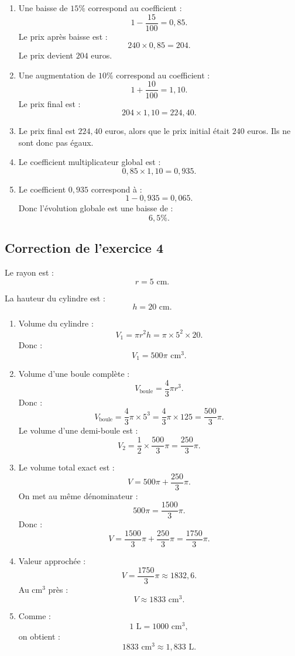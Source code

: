 \documentclass[11pt,a4paper]{article}
\begin{document}
\begin{enumerate}
    \item Une baisse de $15\%$ correspond au coefficient :
    \[
    1-\frac{15}{100}=0{,}85.
    \]
    Le prix après baisse est :
    \[
    240\times 0{,}85=204.
    \]
    Le prix devient $204$ euros.
    
    \item Une augmentation de $10\%$ correspond au coefficient :
    \[
    1+\frac{10}{100}=1{,}10.
    \]
    Le prix final est :
    \[
    204\times 1{,}10=224{,}40.
    \]
    
    \item Le prix final est $224{,}40$ euros, alors que le prix initial était $240$ euros. Ils ne sont donc pas égaux.
    
    \item Le coefficient multiplicateur global est :
    \[
    0{,}85\times 1{,}10=0{,}935.
    \]
    
    \item Le coefficient $0{,}935$ correspond à :
    \[
    1-0{,}935=0{,}065.
    \]
    Donc l'évolution globale est une baisse de :
    \[
    6{,}5\%.
    \]
\end{enumerate}

\subsection*{Correction de l'exercice 4}

Le rayon est :
\[
r=5\text{ cm}.
\]

La hauteur du cylindre est :
\[
h=20\text{ cm}.
\]

\begin{enumerate}
    \item Volume du cylindre :
    \[
    V_1=\pi r^2h=\pi\times 5^2\times 20.
    \]
    Donc :
    \[
    V_1=500\pi\text{ cm}^3.
    \]
    
    \item Volume d'une boule complète :
    \[
    V_{\text{boule}}=\frac{4}{3}\pi r^3.
    \]
    Donc :
    \[
    V_{\text{boule}}=\frac{4}{3}\pi\times 5^3
    =\frac{4}{3}\pi\times 125
    =\frac{500}{3}\pi.
    \]
    Le volume d'une demi-boule est :
    \[
    V_2=\frac{1}{2}\times \frac{500}{3}\pi=\frac{250}{3}\pi.
    \]
    
    \item Le volume total exact est :
    \[
    V=500\pi+\frac{250}{3}\pi.
    \]
    On met au même dénominateur :
    \[
    500\pi=\frac{1500}{3}\pi.
    \]
    Donc :
    \[
    V=\frac{1500}{3}\pi+\frac{250}{3}\pi=\frac{1750}{3}\pi.
    \]
    
    \item Valeur approchée :
    \[
    V=\frac{1750}{3}\pi\approx 1832{,}6.
    \]
    Au cm$^3$ près :
    \[
    V\approx 1833\text{ cm}^3.
    \]
    
    \item Comme :
    \[
    1\text{ L}=1000\text{ cm}^3,
    \]
    on obtient :
    \[
    1833\text{ cm}^3\approx 1{,}833\text{ L}.
    \]
\end{enumerate}
\end{document}
